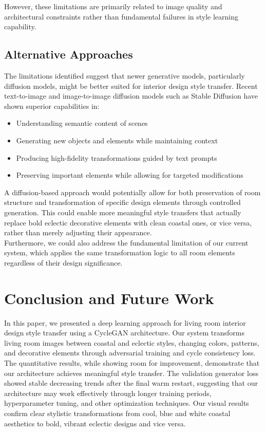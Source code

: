 \documentclass[twocolumn,superscriptaddress,aps]{revtex4-1}
\begin{document}
However, these limitations are primarily related to image quality and architectural constraints rather than fundamental failures in style learning capability.

\subsection{Alternative Approaches}

The limitations identified suggest that newer generative models, particularly diffusion models, might be better suited for interior design style transfer. Recent text-to-image and image-to-image diffusion models such as Stable Diffusion have shown superior capabilities in:

\begin{itemize}
    \item Understanding semantic content of scenes
    \item Generating new objects and elements while maintaining context
    \item Producing high-fidelity transformations guided by text prompts
    \item Preserving important elements while allowing for targeted modifications
\end{itemize}

A diffusion-based approach would potentially allow for both preservation of room structure and transformation of specific design elements through controlled generation. This could enable more meaningful style transfers that actually replace bold eclectic decorative elements with clean coastal ones, or vice versa, rather than merely adjusting their appearance. \\

Furthermore, we could also address the fundamental limitation of our current system, which applies the same transformation logic to all room elements regardless of their design significance.

\section{Conclusion and Future Work}

In this paper, we presented a deep learning approach for living room interior design style transfer using a CycleGAN architecture. Our system transforms living room images between coastal and eclectic styles, changing colors, patterns, and decorative elements through adversarial training and cycle consistency loss. The quantitative results, while showing room for improvement, demonstrate that our architecture achieves meaningful style transfer. The validation generator loss showed stable decreasing trends after the final warm restart, suggesting that our architecture may work effectively through longer training periods, hyperparameter tuning, and other optimization techniques. Our visual results confirm clear stylistic transformations from cool, blue and white coastal aesthetics to bold, vibrant eclectic designs and vice versa. \\
\end{document}
